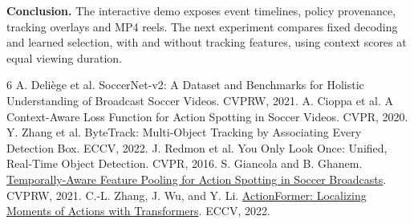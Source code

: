 \documentclass[10pt,twocolumn,letterpaper]{article}
\begin{document}
\textbf{Conclusion.} The interactive demo exposes event timelines, policy provenance, tracking overlays and MP4 reels. The next experiment compares fixed decoding and learned selection, with and without tracking features, using context scores at equal viewing duration.

{\small\begin{thebibliography}{6}
 A. Deli\`ege et al. SoccerNet-v2: A Dataset and Benchmarks for Holistic Understanding of Broadcast Soccer Videos. CVPRW, 2021.
 A. Cioppa et al. A Context-Aware Loss Function for Action Spotting in Soccer Videos. CVPR, 2020.
 Y. Zhang et al. ByteTrack: Multi-Object Tracking by Associating Every Detection Box. ECCV, 2022.
 J. Redmon et al. You Only Look Once: Unified, Real-Time Object Detection. CVPR, 2016.
 S. Giancola and B. Ghanem. \href{https://openaccess.thecvf.com/content/CVPR2021W/CVSports/papers/Giancola_Temporally-Aware_Feature_Pooling_for_Action_Spotting_in_Soccer_Broadcasts_CVPRW_2021_paper.pdf}{Temporally-Aware Feature Pooling for Action Spotting in Soccer Broadcasts}. CVPRW, 2021.
 C.-L. Zhang, J. Wu, and Y. Li. \href{https://www.ecva.net/papers/eccv_2022/papers_ECCV/html/7278_ECCV_2022_paper.php}{ActionFormer: Localizing Moments of Actions with Transformers}. ECCV, 2022.
\end{thebibliography}}
\end{document}
